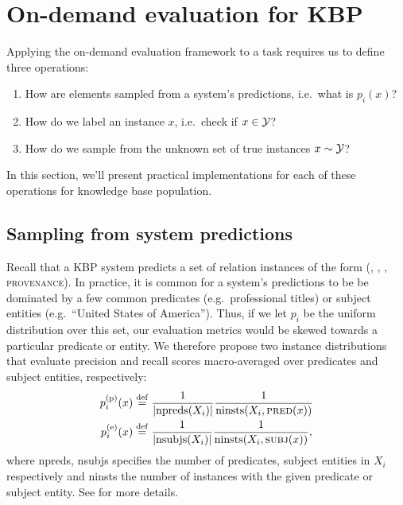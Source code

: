 \section{On-demand evaluation for KBP}
\label{sec:application}
Applying the on-demand evaluation framework to a task requires us to define three operations:
\begin{enumerate}
  \item How are elements  sampled  from a system's predictions, i.e.\ what is $p_i(x)$?
  \item How do we label an instance $x$, i.e.\ check if $x \in \mathcal{Y}$?
  \item How do we sample from the unknown set of true instances $x \sim \mathcal{Y}$?
\end{enumerate}
In this section, we'll present practical implementations for each of these operations for knowledge base population.

\subsection{Sampling from system predictions}
Recall that a KBP system predicts a set of relation instances of the form (, , , \textsc{provenance}).
In practice, it is common for a system's predictions
to be be dominated by a few common predicates (e.g.\ professional titles) or
subject entities (e.g.\ ``United States of America'').
Thus, if we let $p_i$ be the uniform distribution over this set,
our evaluation metrics would be skewed towards a particular predicate or entity.
We therefore propose two instance distributions that evaluate precision and recall scores macro-averaged over predicates and subject entities, respectively:
\begin{align*}
  p_i^\text{(p)}(x) &\stackrel{\rm def}{=} \frac{1}{|\text{npreds}(X_i)|} \frac{1}{\operatorname{ninsts}(X_i, {\textsc{pred}}(x))} \\
  p_i^\text{(e)}(x) &\stackrel{\rm def}{=} \frac{1}{|\text{nsubjs}(X_i)|} \frac{1}{\operatorname{ninsts}(X_i, {\textsc{subj}}(x))},
\end{align*}
where npreds, nsubjs specifies the number of predicates, subject entities in $X_i$ respectively  and ninsts the number of instances with the given predicate or subject entity.
See  for more details.

